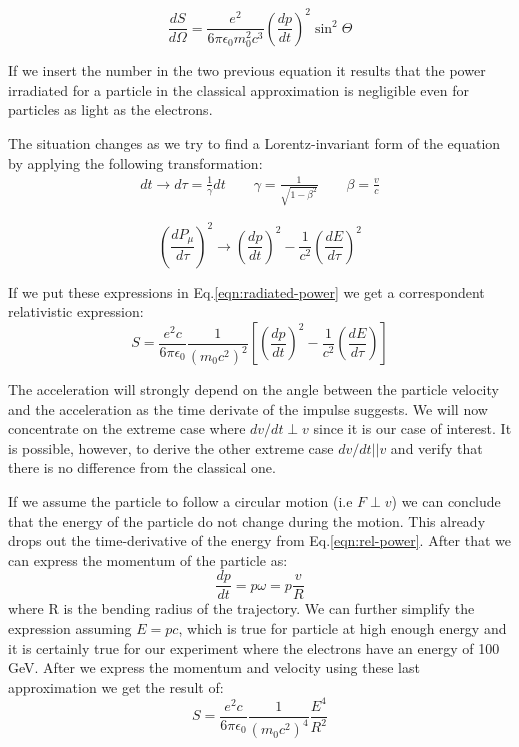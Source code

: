 \begin{equation}
\frac{dS}{d\Omega} = \frac{e^2}{6 \pi \epsilon_0 m_0^2 c^3}\left(\frac{dp}{dt}\right)^2\sin^2\Theta
\label{eqn:angular-dist}
\end{equation}

If we insert the number in the two previous equation it results that the power irradiated for a particle in the classical approximation is negligible even for particles as light as the electrons. \par 

The situation changes as we try to find a Lorentz-invariant form of the equation by applying the following transformation:
\begin{eqnarray}
dt \longrightarrow d\tau=\frac{1}{\gamma}dt \qquad
\gamma = \frac{1}{\sqrt{1-\beta^2}} \qquad \beta=\frac{v}{c}
\label{time_trans}
\end{eqnarray}

\begin{equation}
\left(\frac{dP_{\mu}}{d\tau}\right)^2 \longrightarrow \left(\frac{dp}{dt}\right)^2 - \frac{1}{c^2}\left(\frac{dE}{d\tau}\right)^2
\label{momentum-trans}
\end{equation}

If we put these expressions in Eq.\ref{eqn:radiated-power} we get a correspondent relativistic expression:
\begin{equation}
S = \frac{e^2c}{6\pi \epsilon_0}\frac{1}{(m_0c^2)^2 }\left[\left(\frac{dp}{dt}\right)^2 - \frac{1}{c^2}\left(\frac{dE}{d\tau}\right)\right]
\label{eqn:rel-power}
\end{equation}

The acceleration will strongly depend on the angle between the particle velocity and the acceleration as the time derivate of the impulse suggests. We will now concentrate on the extreme case where $dv/dt \perp v$ since it is our case of interest. It is possible, however, to derive the other extreme case $dv/dt|| v$ and verify that there is no difference from the classical one. \par

If we assume the particle to follow a circular motion (i.e $F \perp v$) we can conclude that the energy of the particle do not change during the motion. This already drops out the time-derivative of the energy from Eq.\ref{eqn:rel-power}. After that we can express the momentum of the particle as:
\[\frac{dp}{dt} =p\omega = p \frac{v}{R}\]
where R is the bending radius of the trajectory. We can further simplify the expression assuming $E=pc$, which is true for particle at high enough energy and it is certainly true for our experiment where the electrons have an energy of 100 GeV. After we express the momentum and velocity using these last approximation we get the result of:
\begin{equation}
S = \frac{e^2c}{6\pi \epsilon_0}\frac{1}{(m_0c^2)^4 }\frac{E^4}{R^2}
\end{equation}

